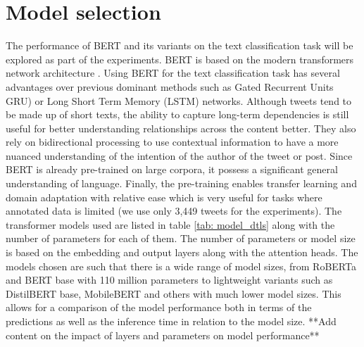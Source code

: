 \section{Model selection}
The performance of BERT and its variants on the text classification task will be explored as part of the experiments. BERT \cite{devlinBERTPretrainingDeep2018} is based on the modern transformers network architecture \cite{vaswaniAttentionAllYou2023a}. Using BERT for the text classification task has several advantages over previous dominant methods such as Gated Recurrent Units GRU) \cite{chungEmpiricalEvaluationGated2014} or Long Short Term Memory (LSTM) \cite{hochreiterLongShortTermMemory1997} networks. Although tweets tend to be made up of short texts, the ability to capture long-term dependencies is still useful for better understanding relationships across the content better. They also rely on bidirectional processing to use contextual information to have a more nuanced understanding of the intention of the author of the tweet or post. Since BERT is already pre-trained on large corpora, it possess a significant general understanding of language. Finally, the pre-training enables transfer learning and domain adaptation with relative ease which is very useful for tasks where annotated data is limited (we use only 3,449 tweets for the experiments).
\newline\newline
The transformer models used are listed in table \ref{tab: model_dtls} along with the number of parameters for each of them. The number of parameters or model size is based on the embedding and output layers along with the attention heads. The models chosen are such that there is a wide range of model sizes, from RoBERTa and BERT base with 110 million parameters to lightweight variants such as DistilBERT base, MobileBERT and others with much lower model sizes. This allows for a comparison of the model performance both in terms of the predictions as well as the inference time in relation to the model size. **Add content on the impact of layers and parameters on model performance**

